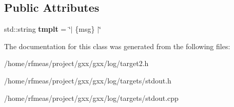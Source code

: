 \subsection*{Public Attributes}
\begin{DoxyCompactItemize}
\item 
std\+::string {\bfseries tmplt} = \char`\"{}$\vert$ \{msg\} $\vert$\char`\"{}\hypertarget{structgxx_1_1log_1_1stdout__target_ad882c5358208de693c37bc920bef95c8}{}\label{structgxx_1_1log_1_1stdout__target_ad882c5358208de693c37bc920bef95c8}

\end{DoxyCompactItemize}


The documentation for this class was generated from the following files\+:\begin{DoxyCompactItemize}
\item 
/home/rfmeas/project/gxx/gxx/log/target2.\+h\item 
/home/rfmeas/project/gxx/gxx/log/targets/stdout.\+h\item 
/home/rfmeas/project/gxx/gxx/log/targets/stdout.\+cpp\end{DoxyCompactItemize}
